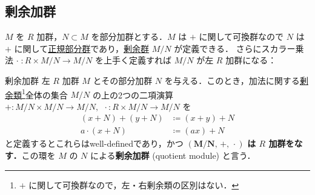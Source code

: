 \documentclass[geometry_main]{subfiles}
\begin{document}
\subsection{剰余加群}

$M$ を $R$ 加群，$N \subset M$ を部分加群とする．$M$ は $+$ に関して可換群なので $N$ は $+$ に関して\hyperref[def.subgroup_normal]{正規部分群}であり，\hyperref[def.quotient_group]{剰余群} $M/N$ が定義できる．
さらにスカラー乗法 $\cdot \; \colon R \times M/N \to M/N$ を上手く定義すれば $M/N$ が左 $R$ 加群になる：

\begin{mytheo}[label=def:quotient-module]{剰余加群}
	左 $R$ 加群 $M$ とその部分加群 $N$ を与える．このとき，加法に関する\hyperref[def.class_residue]{剰余類}\footnote{$+$ に関して可換群なので，左・右剰余類の区別はない．}全体の集合 $M/N$ の上の2つの二項演算 $+\colon M/N \times M/N \to M/N,\; \, \cdot \mathrel{}\colon R \times M/N \to M/N$ を
	\begin{align}
		(x+N) + (y+N) &\coloneqq (x+y) + N \\
		a \cdot (x+N) &\coloneqq (ax) + N
	\end{align}
	と定義するとこれらはwell-definedであり，かつ $\bm{(M/N,\, +,\, \cdot\mathrel{})}$ \textbf{は $R$ 加群をなす．}この環を $M$ の $N$ による\textbf{剰余加群} (quotient module) と言う．
\end{mytheo}

\end{document}
